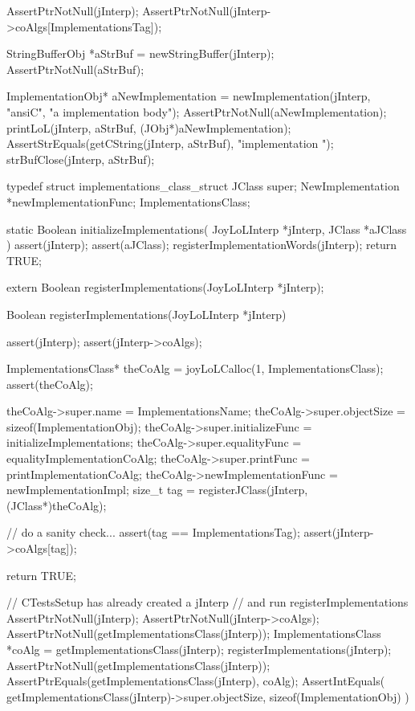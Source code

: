 \startCTest
  AssertPtrNotNull(jInterp);
  AssertPtrNotNull(jInterp->coAlgs[ImplementationsTag]);

  StringBufferObj *aStrBuf = newStringBuffer(jInterp);
  AssertPtrNotNull(aStrBuf);
  
  ImplementationObj* aNewImplementation =
    newImplementation(jInterp, "ansiC", "a implementation body");
  AssertPtrNotNull(aNewImplementation);
  printLoL(jInterp, aStrBuf, (JObj*)aNewImplementation);
  AssertStrEquals(getCString(jInterp, aStrBuf), "implementation ");
  strBufClose(jInterp, aStrBuf);
\stopCTest
\stopTestCase
\stopTestSuite

\startTestSuite[registerImplementations]

\startCHeader
typedef struct implementations_class_struct {
  JClass       super;
  NewImplementation      *newImplementationFunc;
} ImplementationsClass;

\stopCHeader

\startCCode
static Boolean initializeImplementations(
  JoyLoLInterp *jInterp,
  JClass   *aJClass
) {
  assert(jInterp);
  assert(aJClass);
  registerImplementationWords(jInterp);
  return TRUE;
}
\stopCCode

\startCHeader
extern Boolean registerImplementations(JoyLoLInterp *jInterp);
\stopCHeader
{}

\startCCode
Boolean registerImplementations(JoyLoLInterp *jInterp) {
  assert(jInterp);
  assert(jInterp->coAlgs);
  
  ImplementationsClass* theCoAlg
    = joyLoLCalloc(1, ImplementationsClass);
  assert(theCoAlg);
  
  theCoAlg->super.name           = ImplementationsName;
  theCoAlg->super.objectSize     = sizeof(ImplementationObj);
  theCoAlg->super.initializeFunc = initializeImplementations;
  theCoAlg->super.equalityFunc   = equalityImplementationCoAlg;
  theCoAlg->super.printFunc      = printImplementationCoAlg;
  theCoAlg->newImplementationFunc = newImplementationImpl;
  size_t tag =
    registerJClass(jInterp, (JClass*)theCoAlg);
  
  // do a sanity check...
  assert(tag == ImplementationsTag);
  assert(jInterp->coAlgs[tag]);
   
  return TRUE;
}
\stopCCode


\startCTest
  // CTestsSetup has already created a jInterp
  // and run registerImplementations
  AssertPtrNotNull(jInterp);
  AssertPtrNotNull(jInterp->coAlgs);
  AssertPtrNotNull(getImplementationsClass(jInterp));
  ImplementationsClass *coAlg = getImplementationsClass(jInterp);
  registerImplementations(jInterp);
  AssertPtrNotNull(getImplementationsClass(jInterp));
  AssertPtrEquals(getImplementationsClass(jInterp), coAlg);
  AssertIntEquals(
    getImplementationsClass(jInterp)->super.objectSize,
    sizeof(ImplementationObj)
  )
\stopCTest
\stopTestCase
\stopTestSuite
